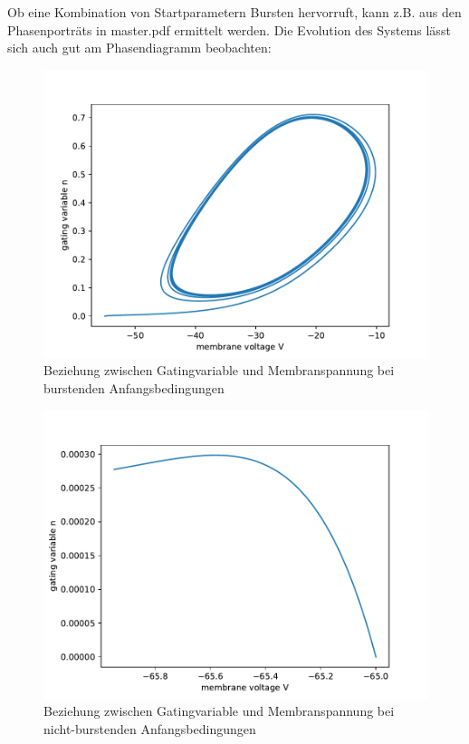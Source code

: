 \documentclass[12pt,a4paper]{article}
\begin{document}
Ob eine Kombination von Startparametern Bursten hervorruft, kann z.B. aus den Phasenporträts in master.pdf ermittelt werden.
\newpage
Die Evolution des Systems lässt sich auch gut am Phasendiagramm beobachten:
\begin{figure}[H]
	\centering
	\includegraphics[scale=0.8]{inapi0d0p.pdf} 
	\caption{Beziehung zwischen Gatingvariable und Membranspannung bei burstenden Anfangsbedingungen}
	\label{burstp}
\end{figure} 
\begin{figure}[H]
	\centering
	\includegraphics[scale=0.8]{inapnbi0d0p.pdf} 
	\caption{Beziehung zwischen Gatingvariable und Membranspannung bei nicht-burstenden Anfangsbedingungen}
	\label{noburstp}
\end{figure}
\end{document}
